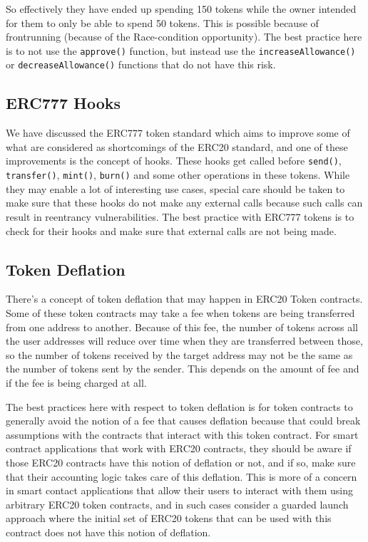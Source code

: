 So effectively they have ended up spending 150 tokens while the owner
intended for them to only be able to spend 50 tokens. This is possible
because of frontrunning (because of the Race-condition opportunity). The
best practice here is to not use the \texttt{approve()} function, but
instead use the \texttt{increaseAllowance()} or
\texttt{decreaseAllowance()} functions that do not have this risk.

\subsection{ERC777 Hooks}\label{erc777-hooks}

We have discussed the ERC777 token standard which aims to improve some
of what are considered as shortcomings of the ERC20 standard, and one of
these improvements is the concept of hooks. These hooks get called
before \texttt{send()}, \texttt{transfer()}, \texttt{mint()},
\texttt{burn()} and some other operations in these tokens. While they
may enable a lot of interesting use cases, special care should be taken
to make sure that these hooks do not make any external calls because
such calls can result in reentrancy vulnerabilities. The best practice
with ERC777 tokens is to check for their hooks and make sure that
external calls are not being made.

\subsection{Token Deflation}\label{token-deflation}

There's a concept of token deflation that may happen in ERC20 Token
contracts. Some of these token contracts may take a fee when tokens are
being transferred from one address to another. Because of this fee, the
number of tokens across all the user addresses will reduce over time
when they are transferred between those, so the number of tokens
received by the target address may not be the same as the number of
tokens sent by the sender. This depends on the amount of fee and if the
fee is being charged at all.

The best practices here with respect to token deflation is for token
contracts to generally avoid the notion of a fee that causes deflation
because that could break assumptions with the contracts that interact
with this token contract. For smart contract applications that work with
ERC20 contracts, they should be aware if those ERC20 contracts have this
notion of deflation or not, and if so, make sure that their accounting
logic takes care of this deflation. This is more of a concern in smart
contact applications that allow their users to interact with them using
arbitrary ERC20 token contracts, and in such cases consider a guarded
launch approach where the initial set of ERC20 tokens that can be used
with this contract does not have this notion of deflation.

